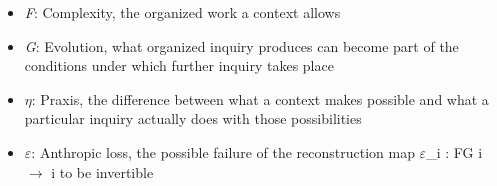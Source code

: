 \documentclass[a4paper,10pt]{article}
\begin{document}
\begin{itemize}
\item \textcolor{complexityazure}{\emph{F}}: Complexity, the organized work a context allows
\item \textcolor{emergencecoral}{\emph{G}}: Evolution, what organized inquiry produces can become part of the conditions under which further inquiry takes place
\item \textcolor{praxispurple}{\emph{\ensuremath{\eta}}}: Praxis, the difference between what a context makes possible and what a particular inquiry actually does with those possibilities
\item \textcolor{anthropiclosspink}{\emph{\ensuremath{\varepsilon}}}: Anthropic loss, the possible failure of the reconstruction map \ensuremath{\varepsilon}\_i : FG i \ensuremath{\to} i to be invertible
\end{itemize}
\end{document}
